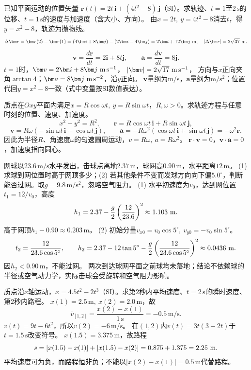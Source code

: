 
\problemtext 已知平面运动的位置矢量
$\bm r(t)=2t\,\bm i+(4t^2-8)\,\bm j$（SI）。求轨迹、$t=1$至$2\,\mathrm s$的位移、$t=1\,\mathrm s$的速度与加速度（含大小、方向）。
\workings
由$x=2t,\ y=4t^2-8$消去$t$，得$y=x^2-8$，轨迹为抛物线。
\[
\Delta\bm r=\bm r(2)-\bm r(1)=(4\bm i+8\bm j)-(2\bm i-4\bm j)
=2\bm i+12\bm j\ {\rm m},\quad |\Delta\bm r|=2\sqrt{37}\ {\rm m}.
\]
\[
\bm v=\frac{d\bm r}{dt}=2\bm i+8t\bm j,\qquad
\bm a=\frac{d\bm v}{dt}=8\bm j.
\]
$t=1$时，$\bm v=2\bm i+8\bm j\ {\rm m\,s^{-1}}$，
$|\bm v|=2\sqrt{17}\ {\rm m\,s^{-1}}$，
方向与$x$正向夹角$\arctan4$；$\bm a=8\bm j\ {\rm m\,s^{-2}}$，沿$y$正向。
\crosscheck $\bm v$量纲为$\mathrm{m/s}$，$\bm a$量纲为$\mathrm{m/s^2}$；位置代回$y=x^2-8$一致（式中变量按SI数值表达）。

\problemtext 质点在$Oxy$平面内满足$x=R\cos\omega t,\ y=R\sin\omega t$，$R,\omega>0$。求轨迹方程与任意时刻的位置、速度、加速度。
\workings
\[
x^2+y^2=R^2,\qquad
\bm r=R\cos\omega t\,\bm i+R\sin\omega t\,\bm j,
\]
\[
\bm v=R\omega(-\sin\omega t\,\bm i+\cos\omega t\,\bm j),
\qquad
\bm a=-R\omega^2(\cos\omega t\,\bm i+\sin\omega t\,\bm j)
=-\omega^2\bm r.
\]
因此为半径$R$、角速度$\omega$的匀速圆周运动，$v=R\omega,\ a=R\omega^2$。
\crosscheck $\bm r\cdot\bm v=0$，$\bm v\cdot\bm a=0$，加速度指向圆心。

\problemtext 网球以$23.6\,\mathrm{m/s}$水平发出，击球点离地$2.37\,\mathrm m$，球网高$0.90\,\mathrm m$，水平距离$12\,\mathrm m$。
(1) 求球到网位置时高于网顶多少；(2) 若其他条件不变而发球方向向下偏$5.0^\circ$，判断能否过网。取$g=9.8\,\mathrm{m/s^2}$，忽略空气阻力。
\workings
(1) 水平初速度为$v_0$，达到网位置$t_1=12/v_0$，高度
\[
h_1=2.37-\frac{g}{2}\left(\frac{12}{23.6}\right)^2
\approx1.103\ {\rm m}.
\]
高于网顶$h_1-0.90\approx0.203\,\mathrm m$。
(2) 初始分量$v_{x0}=v_0\cos5^\circ,\ v_{y0}=-v_0\sin5^\circ$。
\[
t_2=\frac{12}{23.6\cos5^\circ},\qquad
h_2=2.37-12\tan5^\circ
-\frac{g}{2}\left(\frac{12}{23.6\cos5^\circ}\right)^2
\approx0.0436\ {\rm m}.
\]
因$h_2<0.90\,\mathrm m$，不能过网。
\crosscheck 两次到达球网平面之前球均未落地；结论不依赖球的半径或空气动力学，实际击球会受旋转和空气阻力影响。

\problemtext 质点沿$x$轴运动，$x=4.5t^2-2t^3$（SI）。求第$2$秒内平均速度、$t=2\,\mathrm s$的瞬时速度、第$2$秒内路程。
\workings
$x(1)=2.5\,\mathrm m,\ x(2)=2.0\,\mathrm m$，故
\[
\bar v_{[1,2]}=\frac{x(2)-x(1)}{1\,\mathrm s}
=-0.5\,\mathrm{m/s}.
\]
$v(t)=9t-6t^2$，所以$v(2)=-6\,\mathrm{m/s}$。
在$(1,2)$内$v(t)=3t(3-2t)$于$t=1.5\,\mathrm s$改变符号。
$x(1.5)=3.375\,\mathrm m$，故路程
\[
s=[x(1.5)-x(1)]+[x(1.5)-x(2)]
=0.875+1.375=2.25\ {\rm m}.
\]
\crosscheck 平均速度可为负，而路程恒非负；不能以$|x(2)-x(1)|=0.5\,\mathrm m$代替路程。

